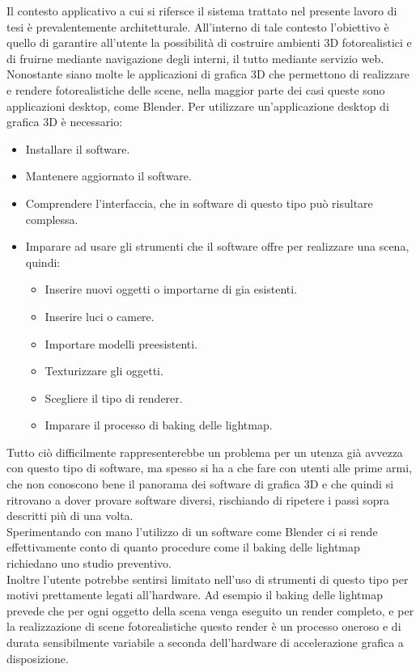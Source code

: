 Il contesto applicativo a cui si rifersce il sistema trattato nel presente lavoro di tesi è prevalentemente architetturale.
All’interno di tale contesto l’obiettivo è quello di garantire all’utente la possibilità di costruire ambienti 3D fotorealistici e di fruirne mediante navigazione degli interni, il tutto mediante servizio web. 
Nonostante siano molte le applicazioni di grafica 3D che permettono di realizzare e rendere fotorealistiche delle scene, nella maggior parte dei casi queste sono applicazioni desktop, come Blender.
Per utilizzare un’applicazione desktop di grafica 3D è necessario:
\begin{itemize}
\item Installare il software.
\item Mantenere aggiornato il software.
\item Comprendere l’interfaccia, che in software di questo tipo può risultare complessa.
\item Imparare ad usare gli strumenti che il software offre per realizzare una scena, quindi:
\begin{itemize}
\item Inserire nuovi oggetti o importarne di gia esistenti.
\item Inserire luci o camere.
\item Importare modelli preesistenti. 
\item Texturizzare gli oggetti.
\item Scegliere il tipo di renderer.
\item Imparare il processo di baking delle lightmap.
\end{itemize}
\end{itemize}
Tutto ciò difficilmente rappresenterebbe un problema per un utenza già avvezza con questo tipo di software, ma spesso si ha a che fare con utenti alle prime armi, che non conoscono bene il panorama dei software di grafica 3D e che quindi si ritrovano a dover provare software diversi, rischiando di ripetere i passi sopra descritti più di una volta. 
\\
Sperimentando con mano l’utilizzo di un software come Blender ci si rende effettivamente conto di quanto procedure come il baking delle lightmap richiedano uno studio preventivo.
\\
Inoltre l’utente potrebbe sentirsi limitato nell’uso di strumenti di questo tipo per motivi prettamente legati all’hardware.
Ad esempio il baking delle lightmap prevede che per ogni oggetto della scena venga eseguito un render completo, e per la realizzazione di scene fotorealistiche questo render è un processo oneroso e di durata sensibilmente variabile a seconda dell’hardware di accelerazione grafica a disposizione. 
